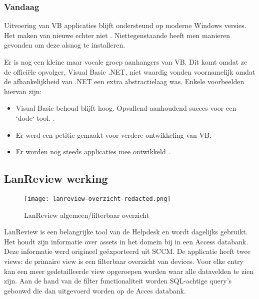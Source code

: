 \subsubsection{Vandaag}

Uitvoering van VB applicaties blijft ondersteund op moderne Windows versies. Het maken van nieuwe echter niet \autocite{MicrosoftDocs2018}. Niettegenstaande heeft men manieren gevonden om deze alsnog te installeren. \autocite{Brust2015}

Er is nog een kleine maar vocale groep aanhangers van VB. Dit komt omdat ze de officiële opvolger, Visual Basic .NET, niet waardig vonden voornamelijk omdat de afhankelijkheid van .NET een extra abstractielaag was. Enkele voorbeelden hiervan zijn: %
\begin{itemize}
    \item Visual Basic behoud blijft hoog. Opvallend aanhoudend succes voor een `dode` tool. \autocite{ISpliter2014}.
    \item Er werd een petitie gemaakt voor verdere ontwikkeling van VB. \autocite{2005}
    \item Er worden nog steeds applicaties mee ontwikkeld \autocite{Ippolito2018}.
\end{itemize}

\subsection{LanReview werking}


\begin{figure}[h!]
    \texttt{[image: lanreview-overzicht-redacted.png]}
    \caption{LanReview algemeen/filterbaar overzicht}
    \label{fig:lr-hoofd}
\end{figure}

LanReview is een belangrijke tool van de Helpdesk en wordt dagelijks gebruikt. Het houdt zijn informatie over assets in het domein bij in een Access databank. Deze informatie werd origineel geëxporteerd uit SCCM.
De applicatie heeft twee views: de primaire view is een filterbaar overzicht van devices. Voor elke entry kan een meer gedetailleerde view opgeroepen worden waar alle datavelden te zien zijn.
Aan de hand van de filter functionaliteit worden SQL-achtige query's gebouwd die dan uitgevoerd worden op de Acces databank.

